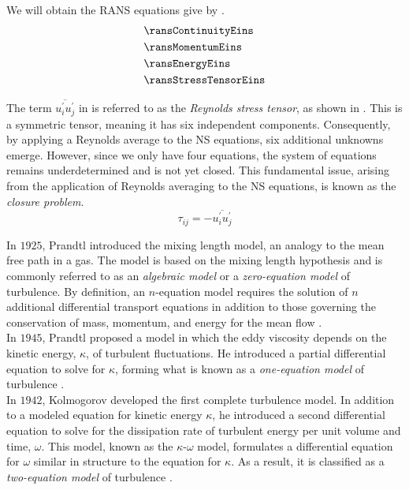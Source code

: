 We will obtain the \gls{RANS} equations give by
.
\begin{subequations}\label{eq:reynoldsAverageNavierStokesEquations}
    \begin{align}
        &\ransContinuityEins \label{eq:ransContinuity}  \\
        &\ransMomentumEins \label{eq:ransMomentum}   \\
        &\ransEnergyEins \label{eq:ransEnergy} \\
        &\ransStressTensorEins \label{eq:ransStressTensor}
    \end{align}
\end{subequations}

The term \(\overline{u^{\prime}_i u^{\prime}_j}\) in  is
referred to as the \textit{Reynolds stress tensor}, as shown in
. This is a symmetric tensor, meaning it has six
independent components. Consequently, by applying a Reynolds average to the
\gls{NS} equations, six additional unknowns emerge. However, since we only have
four equations, the system of equations remains underdetermined and is not yet
closed. This fundamental issue, arising from the application of Reynolds
averaging to the \gls{NS} equations, is known as the \textit{closure problem}.
\begin{equation}\label{eq:reynoldsStressTensor}
    \tau_{ij} = - \overline{u^{\prime}_iu^{\prime}_j} 
\end{equation}

In $1925$, Prandtl introduced the mixing length model, an analogy to the mean
free path in a gas. The model is based on the mixing length hypothesis and is
commonly referred to as an \textit{algebraic model} or a \textit{zero-equation
model} of turbulence. By definition, an $n$-equation model requires the
solution of $n$ additional differential transport equations in addition to
those governing the conservation of mass, momentum, and energy for the mean
flow \cite{Wilcox1998}. \\

In $1945$, Prandtl proposed a model in which the eddy viscosity depends on the
kinetic energy, $\kappa$, of turbulent fluctuations. He introduced a partial
differential equation to solve for $\kappa$, forming what is known as a
\textit{one-equation model} of turbulence \cite{Wilcox1998}.\\

In $1942$, Kolmogorov developed the first complete turbulence model. In
addition to a modeled equation for kinetic energy $\kappa$, he introduced a
second differential equation to solve for the dissipation rate of turbulent
energy per unit volume and time, $\omega$. This model, known as the
$\kappa$-$\omega$ model, formulates a differential equation for $\omega$
similar in structure to the equation for $\kappa$. As a result, it is
classified as a \textit{two-equation model} of turbulence \cite{Wilcox1998}.\\

